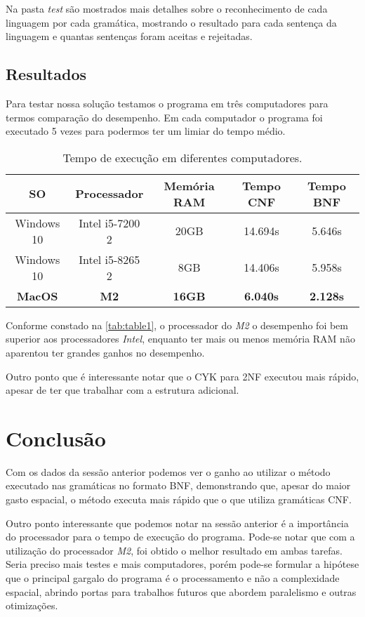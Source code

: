\documentclass[12pt]{article}
\begin{document}
Na pasta \textit{test} são mostrados mais detalhes sobre o reconhecimento de cada linguagem por cada gramática, mostrando o resultado para cada sentença da linguagem e quantas sentenças foram aceitas e rejeitadas.

\subsection{Resultados}

Para testar nossa solução testamos o programa em três computadores para termos comparação do desempenho. Em cada computador o programa foi executado 5 vezes para podermos ter um limiar do tempo médio.

\begin{table}
    \label{tab:table1}
    \centering
    \begin{tabular}{|c|c|c|c|c|}
        \hline
        SO & Processador & Memória RAM & Tempo CNF & Tempo BNF \\
        \hline
        Windows 10 & Intel i5-7200 2 & 20GB & 14.694s & 5.646s \\
        Windows 10 & Intel i5-8265 2 & 8GB & 14.406s & 5.958s \\
        \textbf{MacOS} & \textbf{M2} & \textbf{16GB} & \textbf{6.040s} & \textbf{2.128s} \\
        \hline
    \end{tabular}
    \caption{Tempo de execução em diferentes computadores.}
    \label{tab:mytable}
\end{table}

Conforme constado na \ref{tab:table1}, o processador do \textit{M2} o desempenho foi bem superior aos processadores \textit{Intel}, enquanto ter mais ou menos memória RAM não aparentou ter grandes ganhos no desempenho. 

Outro ponto que é interessante notar que o CYK para 2NF executou mais rápido, apesar de ter que trabalhar com a estrutura adicional.

\section{Conclusão}
Com os dados da sessão anterior podemos ver o ganho ao utilizar o método executado nas gramáticas no formato BNF, demonstrando que, apesar do maior gasto espacial, o método executa mais rápido que o que utiliza gramáticas CNF.

Outro ponto interessante que podemos notar na sessão anterior é a importância do processador para o tempo de execução do programa. Pode-se notar que com a utilização do processador \textit{M2}, foi obtido o melhor resultado em ambas tarefas. Seria preciso mais testes e mais computadores, porém pode-se formular a hipótese que o principal gargalo do programa é o processamento e não a complexidade espacial, abrindo portas para trabalhos futuros que abordem paralelismo e 
outras otimizações.




\end{document}
